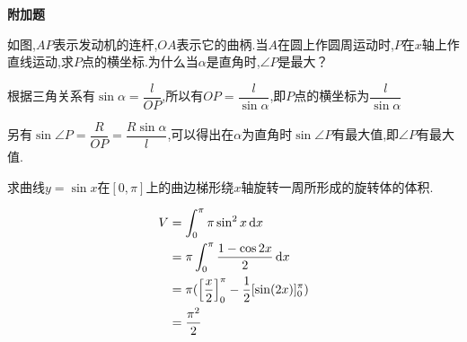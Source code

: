 \begin{questions}
	\begin{center}
		\large\bf 附加题
	\end{center}

	\question
	如图,$AP$表示发动机的连杆,$OA$表示它的曲柄.当$A$在圆上作圆周运动时,$P$在$x$轴上作直线运动,求$P$点的横坐标.为什么当$\alpha$是直角时,$\angle{P}$是最大？

	\begin{center}
	\end{center}
	\begin{solution}
		根据三角关系有$\sin\alpha = \dfrac{l}{OP}$,所以有$OP =
			\dfrac{l}{\sin\alpha}$,即$P$点的横坐标为$\dfrac{l}{\sin\alpha}$

		另有$\sin\angle{P} = \dfrac{R}{OP} =
			\dfrac{R\sin\alpha}{l}$,可以得出在$\alpha$为直角时$\sin\angle{P}$有最大值,即$\angle{P}$有最大值.
	\end{solution}
	\question 求曲线$y=\sin{x}$在$[0,\pi]$上的曲边梯形绕$x$轴旋转一周所形成的旋转体的体积.
	\begin{solution}
		\begin{align*}
			V & = \int_0^{\pi}\pi \sin^2{x}\mathop{}\!\mathrm{d}x                              \\
			  & = \pi\int_0^{\pi}\frac{1-\cos{2x}}{2}\mathop{}\!\mathrm{d}x                    \\
			  & = \pi(\left[\frac{x}{2}\right]_0^{\pi} - \frac12[\sin(2x)]_0^{\pi}) \\
			  & = \frac{\pi^2}{2}
		\end{align*}
	\end{solution}

\end{questions}
